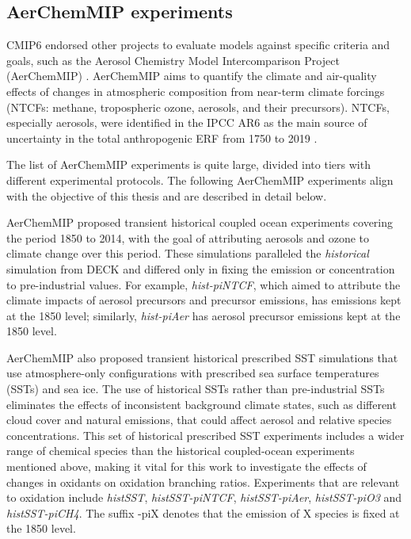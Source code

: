 \subsection{AerChemMIP experiments}

CMIP6 endorsed other projects to evaluate models against specific criteria and goals, such as the Aerosol Chemistry Model Intercomparison Project (AerChemMIP) \citep{collinsAerChemMIPQuantifyingEffects2017}.  AerChemMIP aims to quantify the climate and air-quality effects of changes in atmospheric composition from near-term climate forcings (NTCFs: methane, tropospheric ozone, aerosols, and their precursors). NTCFs, especially aerosols, were identified in the IPCC AR6 as the main source of uncertainty in the total anthropogenic ERF from 1750 to 2019 \citep[see figure \ref{fig:1.ERF} and][]{forsterEarthEnergyBudget2021}.

The list of AerChemMIP experiments is quite large, divided into tiers with different experimental protocols. The following AerChemMIP experiments align with the objective of this thesis and are described in detail below.

AerChemMIP proposed transient historical coupled ocean experiments covering the period 1850 to 2014, with the goal of attributing aerosols and ozone to climate change over this period.
These simulations paralleled the \textit{historical} simulation from DECK and differed only in fixing the emission or concentration to pre-industrial values. For example, \textit{hist-piNTCF}, which aimed to attribute the climate impacts of aerosol precursors and  precursor emissions, has emissions kept at the 1850 level; similarly, \textit{hist-piAer} has aerosol precursor emissions kept at the 1850 level. 

AerChemMIP also proposed transient historical prescribed SST simulations that use atmosphere-only configurations with prescribed sea surface temperatures (SSTs) and sea ice. The use of historical SSTs rather than pre-industrial SSTs eliminates the effects of inconsistent background climate states, such as different cloud cover and natural emissions, that could affect aerosol and relative species concentrations. This set of historical prescribed SST experiments includes a wider range of chemical species than the historical coupled-ocean experiments mentioned above, making it vital for this work to investigate the effects of changes in oxidants on oxidation branching ratios. Experiments that are relevant to  oxidation include \textit{histSST}, \textit{histSST-piNTCF}, \textit{histSST-piAer}, \textit{histSST-piO3} and \textit{histSST-piCH4}. The suffix -piX denotes that the emission of X species is fixed at the 1850 level.


